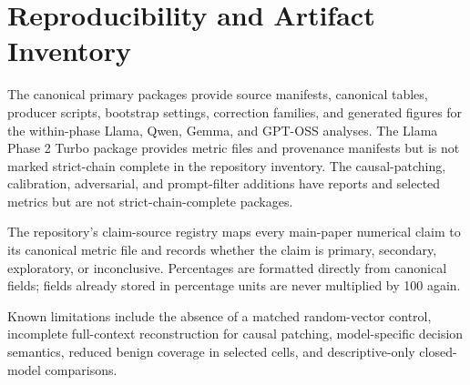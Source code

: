 \section{Reproducibility and Artifact Inventory}
The canonical primary packages provide source manifests, canonical tables, producer scripts, bootstrap settings, correction families, and generated figures for the within-phase Llama, Qwen, Gemma, and GPT-OSS analyses. The Llama Phase 2 Turbo package provides metric files and provenance manifests but is not marked strict-chain complete in the repository inventory. The causal-patching, calibration, adversarial, and prompt-filter additions have reports and selected metrics but are not strict-chain-complete packages.

The repository's claim-source registry maps every main-paper numerical claim to its canonical metric file and records whether the claim is primary, secondary, exploratory, or inconclusive. Percentages are formatted directly from canonical fields; fields already stored in percentage units are never multiplied by 100 again.

Known limitations include the absence of a matched random-vector control, incomplete full-context reconstruction for causal patching, model-specific decision semantics, reduced benign coverage in selected cells, and descriptive-only closed-model comparisons.